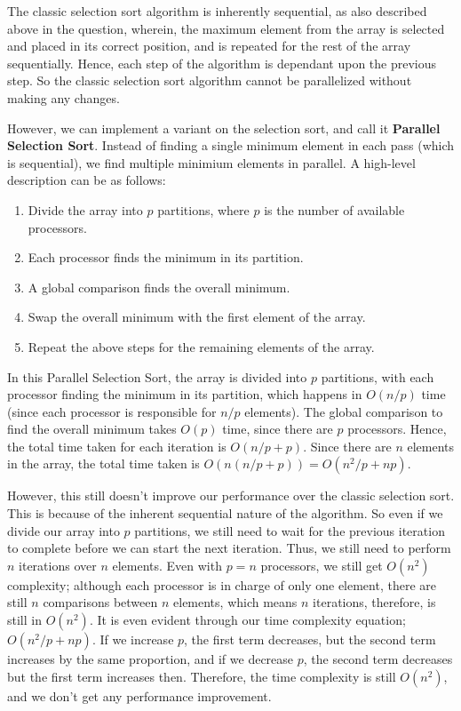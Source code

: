 \documentclass[addpoints]{exam}
\begin{document}
\begin{questions}
  \begin{solution}
    The classic selection sort algorithm is inherently sequential, as also described above in the question, wherein, the maximum element from the array is selected and placed in its correct position, and is repeated for the rest of the array sequentially. Hence, each step of the algorithm is dependant upon the previous step. So the classic selection sort algorithm cannot be parallelized without making any changes.

    However, we can implement a variant on the selection sort, and call it \textbf{Parallel Selection Sort}. Instead of finding a single minimum element in each pass (which is sequential), we find multiple minimium elements in parallel. A high-level description can be as follows:
    \begin{enumerate}
      \item Divide the array into $p$ partitions, where $p$ is the number of available processors.
      \item Each processor finds the minimum in its partition.
      \item A global comparison finds the overall minimum.
      \item Swap the overall minimum with the first element of the array.
      \item Repeat the above steps for the remaining elements of the array.
    \end{enumerate}

    In this Parallel Selection Sort, the array is divided into $p$ partitions, with each processor finding the minimum in its partition, which happens in $O(n / p)$ time (since each processor is responsible for $n/p$ elements). The global comparison to find the overall minimum takes $O(p)$ time, since there are $p$ processors. Hence, the total time taken for each iteration is $O(n / p + p)$. Since there are $n$ elements in the array, the total time taken is $O(n(n/p + p)) = O(n^2 / p + np)$. 
    
    However, this still doesn't improve our performance over the classic selection sort. This is because of the inherent sequential nature of the algorithm. So even if we divide our array into $p$ partitions, we still need to wait for the previous iteration to complete before we can start the next iteration. Thus, we still need to perform $n$ iterations over $n$ elements. Even with $p = n$ processors, we still get $O(n^2)$ complexity; although each processor is in charge of only one element, there are still $n$ comparisons between $n$ elements, which means $n$ iterations, therefore, is still in $O(n^2)$. It is even evident through our time complexity equation; $ O(n^2/p + np) $. If we increase $p$, the first term decreases, but the second term increases by the same proportion, and if we decrease $p$, the second term decreases but the first term increases then. Therefore, the time complexity is still $O(n^2)$, and we don't get any performance improvement.
  
  \end{solution}

\end{questions}
\end{document}
